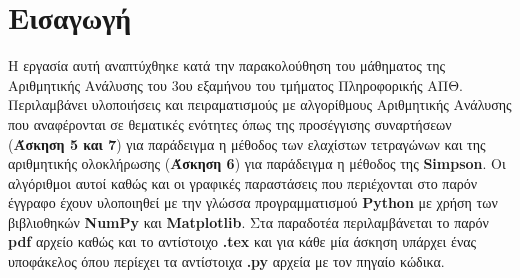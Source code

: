 \documentclass[Second Project.tex]{subfiles}
\begin{document}
\section{ Εισαγωγή }

Η εργασία αυτή αναπτύχθηκε κατά την παρακολούθηση του μάθηματος της Αριθμητικής Ανάλυσης του 3ου εξαμήνου του τμήματος Πληροφορικής ΑΠΘ. 
Περιλαμβάνει υλοποιήσεις και πειραματισμούς με αλγορίθμους Αριθμητικής Ανάλυσης που αναφέρονται σε θεματικές ενότητες όπως της προσέγγισης 
συναρτήσεων (\textbf{Άσκηση 5 και 7}) για παράδειγμα η μέθοδος των ελαχίστων τετραγώνων και της αριθμητικής ολοκλήρωσης (\textbf{Άσκηση 6}) 
για παράδειγμα η μέθοδος της \textbf{\textlatin{Simpson}}. Οι αλγόριθμοι αυτοί καθώς και οι γραφικές παραστάσεις που περιέχονται στο παρόν 
έγγραφο έχουν υλοποιηθεί με την γλώσσα προγραμματισμού \textbf{\textlatin{Python}} με χρήση των βιβλιοθηκών \textbf{\textlatin{NumPy}} και 
\textbf{\textlatin{Matplotlib}}. Στα παραδοτέα περιλαμβάνεται το παρόν \textbf{\textlatin{pdf}} αρχείο καθώς και το αντίστοιχο 
\textbf{\textlatin{.tex}} και για κάθε μία άσκηση υπάρχει ένας υποφάκελος όπου περίεχει τα αντίστοιχα \textbf{\textlatin{.py}} αρχεία με τον 
πηγαίο κώδικα.
\newpage
\end{document}
